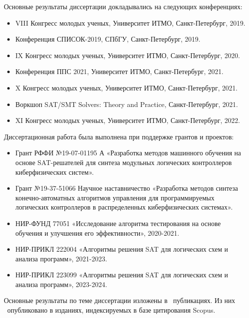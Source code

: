 \probation
Основные результаты диссертации докладывались на следующих конференциях:
\begin{itemize}[beginpenalty=10000]
    \item VIII Конгресс молодых ученых, Университет ИТМО, Санкт-Петербург, 2019.
    \item Конференция СПИСОК-2019, СПбГУ, Санкт-Петербург, 2019.
    \item IX Конгресс молодых ученых, Университет ИТМО, Санкт-Петербург, 2020.
    \item Конференция ППС 2021, Университет ИТМО, Санкт-Петербург, 2021.
    \item X Конгресс молодых ученых, Университет ИТМО, Санкт-Петербург, 2021.
    \item Воркшоп SAT/SMT Solvers: Theory and Practice, Санкт-Петербург, 2021.
    \item XI Конгресс молодых ученых, Университет ИТМО, Санкт-Петербург, 2022.
\end{itemize}

Диссертационная работа была выполнена при поддержке грантов и проектов:
\begin{itemize}[beginpenalty=10000]
    \item Грант РФФИ №19-07-01195 А «Разработка методов машинного
    обучения на основе SAT-решателей для синтеза модульных логических контроллеров киберфизических систем».
    \item Грант №19-37-51066 Научное наставничество «Разработка методов синтеза конечно-автоматных алгоритмов управления для программируемых логических контроллеров в распределенных киберфизических системах».
    \item НИР-ФУНД 77051 «Исследование алгоритма тестирования на основе обучения и улучшения его эффективности», 2020-2021.
    \item НИР-ПРИКЛ 222004 «Алгоритмы решения SAT для логических схем и анализа программ», 2021-2023.
    \item НИР-ПРИКЛ 223099 «Алгоритмы решения SAT для логических схем и анализа программ», 2023-2024.
\end{itemize}



\publications
Основные результаты по теме диссертации изложены в \theAllMyPapers~публикациях.
Из них
\theScopusPapers~опубликовано в изданиях, индексируемых в базе цитирования Scopus.


